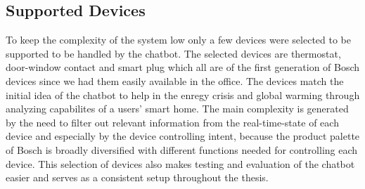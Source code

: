 \subsection{Supported Devices}
To keep the complexity of the system low only a few devices were selected to be supported to be handled by the chatbot.
The selected devices are thermostat, door-window contact and smart plug which all are of the first generation of Bosch devices since we had them easily available in the office.
The devices match the initial idea of the chatbot to help in the enregy crisis and global warming through analyzing capabilites of a users' smart home.
The main complexity is generated by the need to filter out relevant information from the real-time-state of each device and especially by the device controlling intent, because the product palette of Bosch is broadly diversified with different functions needed for controlling each device. 
This selection of devices also makes testing and evaluation of the chatbot easier and serves as a consistent setup throughout the thesis.

